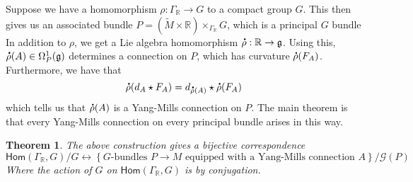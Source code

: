 \documentclass[psamsfonts, 12pt]{amsart}
\newtheorem{thm}{Theorem}[section]
\theoremstyle{definition}
\theoremstyle{remark}
\renewcommand{\hom}{\mathsf{Hom}}
\newcommand{\R}{\mathbb{R}}
\newcommand{\g}{\mathfrak{g}}
\newcommand*{\dt}[1]{%
   \accentset{\mbox{\large\bfseries .}}{#1}}
\newcommand{\set}[1]{\left\lbrace #1 \right\rbrace}
\begin{document}
Suppose we have a homomorphism $\rho : \Gamma_\R \to G$ to a compact group $G$.
This then gives us an associated bundle
$P = (\widetilde{M}\times \R) \times_{\Gamma_\R} G$, which is a principal $G$ bundle
In addition to $\rho$, we get a Lie algebra homomorphism
$\dt{\rho} : \R \to \g$. Using this, $\dt{\rho}(A) \in \Omega^1_P(\g)$ determines
a connection on $P$, which has curvature $\dt{\rho}(F_A)$. Furthermore, we have that
\[
\dt{\rho}(d_A\star F_A) = d_{\dt{\rho}(A)}\star\dt{\rho}(F_A)
\]
which tells us that $\dt{\rho}(A)$ is a Yang-Mills connection on $P$. The main theorem
is that every Yang-Mills connection on every principal bundle arises in this way.
%
\begin{thm}
The above construction gives a bijective correspondence
\[
\hom(\Gamma_\R, G) / G \longleftrightarrow
\set{G\text{-bundles } P \to M
\text{ equipped with a Yang-Mills connection } A }/\mathscr{G}(P)
\]
Where the action of $G$ on $\hom(\Gamma_\R,G)$ is by conjugation.
\end{thm}
%
\end{document}
